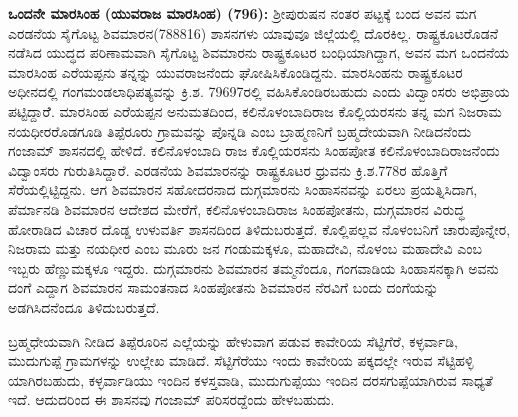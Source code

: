 \textbf{ ಒಂದನೇ ಮಾರಸಿಂಹ (ಯುವರಾಜ ಮಾರಸಿಂಹ) (796):} ಶ‍್ರೀಪುರುಷನ ನಂತರ ಪಟ್ಟಕ್ಕೆ ಬಂದ ಅವನ ಮಗ ಎರಡನೆಯ ಸೈಗೊಟ್ಟ ಶಿವಮಾರನ(788\enginline{-}816) ಶಾಸನಗಳು ಯಾವುವೂ ಜಿಲ್ಲೆಯಲ್ಲಿ ದೊರಕಿಲ್ಲ. ರಾಷ್ಟ್ರಕೂಟರೊಡನೆ ನಡೆಸಿದ ಯುದ್ಧದ ಪರಿಣಾಮವಾಗಿ ಸೈಗೊಟ್ಟ ಶಿವಮಾರನು ರಾಷ್ಟ್ರಕೂಟರ ಬಂಧಿಯಾಗಿದ್ದಾಗ, ಅವನ ಮಗ ಒಂದನೆಯ ಮಾರಸಿಂಹ ಎರೆಯಪ್ಪನು ತನ್ನನ್ನು ಯುವರಾಜನೆಂದು ಘೋಷಿಸಿಕೊಂಡಿದ್ದನು. ಮಾರಸಿಂಹನು ರಾಷ್ಟ್ರಕೂಟರ ಅಧೀನದಲ್ಲಿ ಗಂಗಮಂಡಲಾಧಿಪತ್ಯವನ್ನು ಕ್ರಿ.ಶ. 796\enginline{-}97ರಲ್ಲಿ ವಹಿಸಿಕೊಂಡಿರಬಹುದು ಎಂದು ವಿದ್ವಾಂಸರು ಅಭಿಪ್ರಾಯ ಪಟ್ಟಿದ್ದಾರೆೆ. ಮಾರಸಿಂಹ ಎರೆಯಪ್ಪನ ಅನುಮತದಿಂದ, ಕಲಿನೊಳಂಬಾದಿರಾಜ ಕೊಲ್ಲಿಯರಸನು ತನ್ನ ಮಗ ನಿಜರಾಮ ನಯಧೀರರೊಡ\-ಗೂಡಿ ತಿಪ್ಪೆರೂರು ಗ್ರಾಮವನ್ನು ಪೊನ್ನಡಿ ಎಂಬ ಬ್ರಾಹ್ಮಣನಿಗೆ ಬ್ರಹ್ಮದೇಯವಾಗಿ ನೀಡಿದನೆಂದು ಗಂಜಾಮ್ ಶಾಸನದಲ್ಲಿ ಹೇಳಿದೆ. ಕಲಿನೊಳಂಬಾದಿ ರಾಜ ಕೊಲ್ಲಿಯರಸನು ಸಿಂಹಪೋತ ಕಲಿನೊಳಂಬಾದಿರಾಜನೆಂದು ವಿದ್ವಾಂಸರು ಗುರುತಿಸಿದ್ದಾರೆ. ಎರಡನೆಯ ಶಿವಮಾರನನ್ನು ರಾಷ್ಟ್ರಕೂಟರ ಧ್ರುವನು ಕ್ರಿ.ಶ.778ರ ಹೊತ್ತಿಗೆ ಸೆರೆಯಲ್ಲಿಟ್ಟಿದ್ದನು. ಆಗ ಶಿವಮಾರನ ಸಹೋದರನಾದ ದುಗ್ಗಮಾರನು ಸಿಂಹಾಸನವನ್ನು ಏರಲು ಪ್ರಯತ್ನಿಸಿದಾಗ, ಪೆರ್ಮಾನಡಿ ಶಿವಮಾರನ ಆದೇಶದ ಮೇರೆಗೆ, ಕಲಿನೊಳಂಬಾದಿರಾಜ ಸಿಂಹಪೋತನು, ದುಗ್ಗಮಾರನ ವಿರುದ್ಧ ಹೋರಾಡಿದ ವಿಚಾರ ದೊಡ್ಡ ಉಳುವರ್ತಿ ಶಾಸನದಿಂದ ತಿಳಿದುಬರುತ್ತದೆ. ಕೊಲ್ಲಿಪಲ್ಲವ ನೊಳಂಬನಿಗೆ ಚಾರುಪೊನ್ನೇರ, ನಿಜರಾಮ ಮತ್ತು ನಯಧೀರ ಎಂಬ ಮೂರು ಜನ ಗಂಡುಮಕ್ಕಳೂ, ಮಹಾದೇವಿ, ನೊಳಂಬ ಮಹಾದೇವಿ ಎಂಬ ಇಬ್ಬರು ಹೆಣ್ಣುಮಕ್ಕಳೂ ಇದ್ದರು. ದುಗ್ಗಮಾರನು ಶಿವಮಾರನ ತಮ್ಮನೆಂದೂ, ಗಂಗವಾಡಿಯ ಸಿಂಹಾಸನಕ್ಕಾಗಿ ಅವನು ದಂಗೆ ಎದ್ದಾಗ ಶಿವಮಾರನ ಸಾಮಂತನಾದ ಸಿಂಹಪೋತನು ಶಿವಮಾರನ ನೆರವಿಗೆ ಬಂದು ದಂಗೆಯನ್ನು ಅಡಗಿಸಿದನೆಂದೂ ತಿಳಿದುಬರುತ್ತದೆ.

ಬ್ರಹ್ಮಧೇಯವಾಗಿ ನೀಡಿದ ತಿಪ್ಪೆರೂರಿನ ಎಲ್ಲೆಯನ್ನು ಹೇಳುವಾಗ ಪಡುವ ಕಾವೇರಿಯ ಸೆಟ್ಟಿಗೆರೆ, ಕಳ್ಳರ್ವಾಡಿ, ಮುದುಗುಪ್ಪೆ ಗ್ರಾಮಗಳನ್ನು ಉಲ್ಲೇಖ ಮಾಡಿದೆ. ಸೆಟ್ಟಿಗೆರೆಯು ಇಂದು ಕಾವೇರಿಯ ಪಕ್ಕದಲ್ಲೇ ಇರುವ ಸೆಟ್ಟಿಹಳ್ಳಿ ಯಾಗಿರಬಹುದು, ಕಳ್ಳರ್ವಾಡಿಯು ಇಂದಿನ ಕಳಸ್ತವಾಡಿ, ಮುದುಗುಪ್ಪೆಯು ಇಂದಿನ ದರಸಗುಪ್ಪೆಯಾಗಿರುವ ಸಾಧ್ಯತೆ ಇದೆ. ಆದುದರಿಂದ ಈ ಶಾಸನವು ಗಂಜಾಮ್ ಪರಿಸರದ್ದೆಂದು ಹೇಳಬಹುದು.

